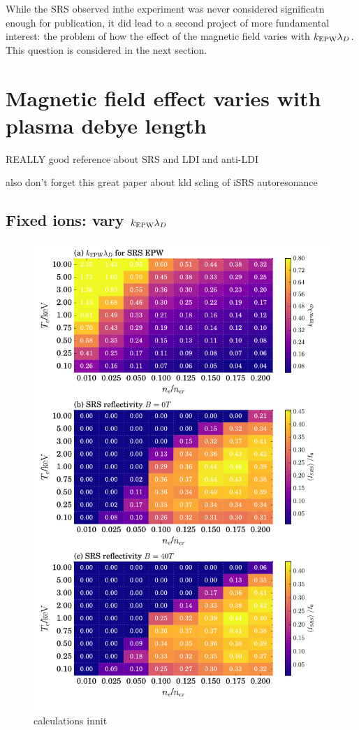 While the SRS observed inthe experiment was never considered significatn enough for publication, it did lead to a second project of more fundamental interest: the problem of how the effect of the magnetic field varies with $k_\mathrm{EPW}\lambda_D$. This question is considered in the next section.

\section{Magnetic field effect varies with plasma debye length}

\citep{Feng2018} REALLY good reference about SRS and LDI and anti-LDI

also don't forget this great paper about kld scling of iSRS autoresonance \citep{Chapman2013}

\subsection{Fixed ions: vary $k_\mathrm{EPW}\lambda_D$}

\begin{figure}[ht]
   \centering
    \includegraphics[width=\columnwidth]{Chapters/C6_magSRS/figa_figb_figc.pdf}
    \caption{calculations innit}
    \label{fig:fixed_ion_scan}
\end{figure}{}

